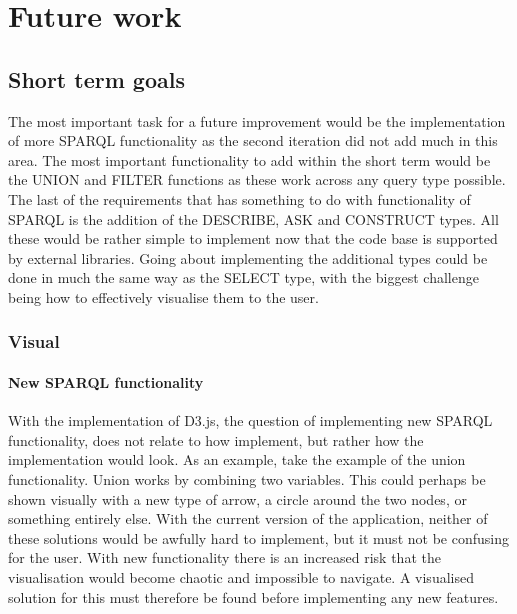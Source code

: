 \chapter{Future work}
\label{chap:future-work}

\section{Short term goals}
The most important task for a future improvement would be the implementation of more SPARQL functionality as the second iteration did not add much in this area. The most important functionality to add within the short term would be the UNION and FILTER functions as these work across any query type possible. The last of the requirements that has something to do with functionality of SPARQL is the addition of the DESCRIBE, ASK and CONSTRUCT types. All these would be rather simple to implement now that the code base is supported by external libraries. Going about implementing the additional types could be done in much the same way as the SELECT type, with the biggest challenge being how to effectively visualise them to the user. 

\subsection{Visual}
\subsubsection{New SPARQL functionality}
With the implementation of D3.js, the question of implementing new SPARQL functionality, does not relate to how implement, but rather how the implementation would look. As an example, take the example of the union functionality. Union works by combining two variables\cite{UNIONWiki}. This could perhaps be shown visually with a new type of arrow, a circle around the two nodes, or something entirely else. With the current version of the application, neither of these solutions would be awfully hard to implement, but it must not be confusing for the user. With new functionality there is an increased risk that the visualisation would become chaotic and impossible to navigate. A visualised solution for this must therefore be found before implementing any new features.

